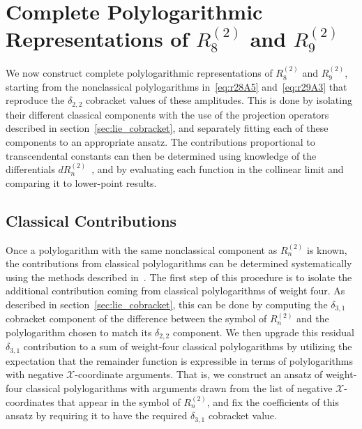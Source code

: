 \documentclass[11pt]{article}
\def\x{\mathcal{X}}
\def\pdfeq#1{\texorpdfstring{$#1$}{a}}
\begin{document}
\section{Complete Polylogarithmic Representations of \pdfeq{R_8^{(2)}} and \pdfeq{R_9^{(2)}}}
\label{sec:r28_and_r29}

We now construct complete polylogarithmic representations of $R_8^{(2)}$\! and $R_9^{(2)}$\!, starting from the nonclassical polylogarithms in~\eqref{eq:r28A5} and~\eqref{eq:r29A3} that reproduce the $\delta_{2,2}$ cobracket values of these amplitudes. This is done by isolating their different classical components with the use of the projection operators described in section~\ref{sec:lie_cobracket}, and separately fitting each of these components to an appropriate ansatz. The contributions proportional to transcendental constants can then be determined using knowledge of the differentials $dR_n^{(2)}$\!~\cite{CaronHuot:2011ky,Golden:2013lha}, and by evaluating each function in the collinear limit and comparing it to lower-point results.

\subsection{Classical Contributions}
\label{sec:classical}

Once a polylogarithm with the same nonclassical component as $R_n^{(2)}$\! is known, the contributions from classical polylogarithms can be determined systematically using the methods described in~\cite{Goncharov:2010jf,Golden:2014xqf}. The first step of this procedure is to isolate the additional contribution coming from classical polylogarithms of weight four. As described in section~\ref{sec:lie_cobracket}, this can be done by computing the $\delta_{3,1}$ cobracket component of the difference between the symbol of $R_n^{(2)}$\! and the polylogarithm chosen to match its $\delta_{2,2}$ component. We then upgrade this residual $\delta_{3,1}$ contribution to a sum of weight-four classical polylogarithms by utilizing the expectation that the remainder function is expressible in terms of polylogarithms with negative $\x$-coordinate arguments. That is, we construct an ansatz of weight-four classical polylogarithms with arguments drawn from the list of negative $\x$-coordinates that appear in the symbol of $R_n^{(2)}$\!, and fix the coefficients of this ansatz by requiring it to have the required $\delta_{3,1}$ cobracket value.
\end{document}

